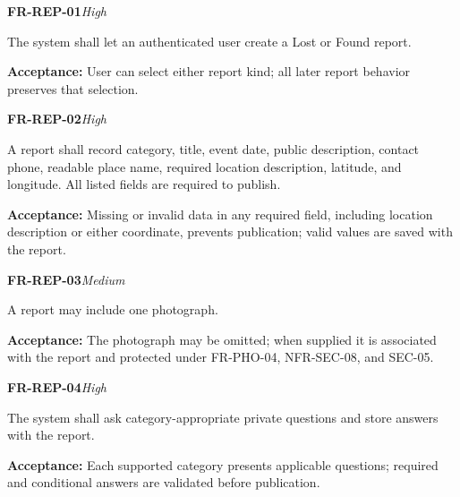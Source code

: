 \documentclass[12pt,a4paper,oneside]{report}
\begin{document}
\noindent\begin{minipage}{\linewidth}\textbf{FR-REP-01}\hfill\textit{High}\par\nopagebreak

The system shall let an authenticated user create a Lost or Found report.

{\color{muted}\textbf{Acceptance:} User can select either report kind; all later report behavior preserves that selection.\par}\end{minipage}\par\vspace{5pt}

\noindent\begin{minipage}{\linewidth}\textbf{FR-REP-02}\hfill\textit{High}\par\nopagebreak

A report shall record category, title, event date, public description, contact phone, readable place name, required location description, latitude, and longitude. All listed fields are required to publish.

{\color{muted}\textbf{Acceptance:} Missing or invalid data in any required field, including location description or either coordinate, prevents publication; valid values are saved with the report.\par}\end{minipage}\par\vspace{5pt}

\noindent\begin{minipage}{\linewidth}\textbf{FR-REP-03}\hfill\textit{Medium}\par\nopagebreak

A report may include one photograph.

{\color{muted}\textbf{Acceptance:} The photograph may be omitted; when supplied it is associated with the report and protected under FR-PHO-04, NFR-SEC-08, and SEC-05.\par}\end{minipage}\par\vspace{5pt}

\noindent\begin{minipage}{\linewidth}\textbf{FR-REP-04}\hfill\textit{High}\par\nopagebreak

The system shall ask category-appropriate private questions and store answers with the report.

{\color{muted}\textbf{Acceptance:} Each supported category presents applicable questions; required and conditional answers are validated before publication.\par}\end{minipage}\par\vspace{5pt}
\end{document}
